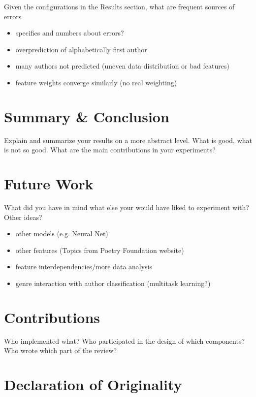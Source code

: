 \documentclass[11pt]{article}
\begin{document}
Given the configurations in the Results section, what are frequent sources of errors
\begin{itemize}
\item specifics and numbers about errors?
\item overprediction of alphabetically first author
\item many authors not predicted (uneven data distribution or bad features)
\item feature weights converge similarly (no real weighting)
\end{itemize}

\section{Summary \& Conclusion}

Explain and summarize your results on a more abstract level. What is good, what is not so
good. What are the main contributions in your experiments?


\section{Future Work}

What did you have in mind what else your
would have liked to experiment with? Other ideas?
\begin{itemize}
\item other models (e.g. Neural Net)
\item other features (Topics from Poetry Foundation website)
\item feature interdependencies/more data analysis
\item genre interaction with author classification (multitask learning?)
\end{itemize}


%
%


\appendix

\section{Contributions}
Who implemented what?
Who participated in the design of which components?
Who wrote which part of the review?
\section{Declaration of Originality}
\label{sec:appendix}
\end{document}
